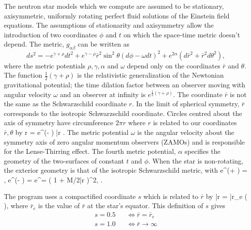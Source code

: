 The neutron star models which we compute are assumed to be stationary, 
axisymmetric, uniformly rotating perfect fluid solutions of the Einstein
field equations. The assumptions of stationarity and axisymmetry allow the
introduction of two  coordinates $\phi$ and $t$ on which the 
space-time metric doesn't depend. 
The metric, $g_{\alpha \beta}$ can be written
as 
\begin{equation}
ds^2 = - e^{\gamma + \rho} dt^2 
	+ e^{\gamma - \rho} \bar{r}^2 \sin ^2 \theta \left(
		d\phi - \omega dt \right)^2 
	+ e^{2 \alpha} \left( d\bar{r}^2 + \bar{r}^2 d\theta^2\right),
	\label{metric}
\end{equation}
where the metric potentials $\rho, \gamma, \alpha$ and $\omega$ depend only
on the coordinates $\bar{r}$ and $\theta$. 
The function $\frac{1}{2}(\gamma + \rho)$
 is the relativistic
generalization of the Newtonian gravitational potential; the time dilation
factor between an observer moving with angular velocity $\omega$ and an
observer at infinity is $e^{\frac{1}{2}(\gamma + \rho)}$.
 The coordinate $\bar{r}$ is not the same as the Schwarzschild
coordinate $r$. In the limit of spherical symmetry, 
$\bar{r}$ corresponds to the
isotropic Schwarzschild coordinate. Circles centred about the axis of 
symmetry have circumference $2 \pi r$ where $r$ is related to our 
coordinates $\bar{r},\theta$ by 
\be
r = e^{(\gamma - \rho)} \bar{r} \sin \theta .
\label{radius}
\ee
The metric potential $\omega$ is the angular velocity about the symmetry
axis  of 
zero angular momentum observers 
(ZAMOs) and is responsible for the Lense-Thirring effect. 
The fourth metric potential, $\alpha$ specifies the geometry of the 
two-surfaces of constant $t$ and $\phi$. When the star is non-rotating, the
exterior geometry is that of the isotropic Schwarzschild metric, with
\be
e^{(\gamma + \rho)} = , \;
e^{(\gamma - \rho)} = e^\alpha = \left( 1 + M/2\bar{r} \right)^2,
 \; .
\label{isotropic}
\ee

The program uses a compactified coordinate $s$ which is related to 
$\bar{r}$ by 
\be
\bar{r} = \bar{r}_e \left(  \right),
\ee
where $\bar{r}_e$ is the value of $\bar{r}$ at the star's equator. 
This definition of $s$ gives
\begin{eqnarray}
s = 0.5 && \Leftrightarrow \bar{r} = \bar{r}_e \\
s = 1.0 && \Leftrightarrow \bar{r} \rightarrow \infty
\end{eqnarray}

